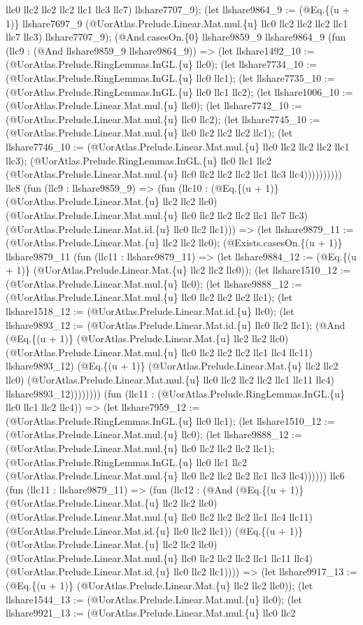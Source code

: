 \documentclass[11pt]{article}
\begin{document}
llc0 llc2 llc2 llc2 llc1 llc3 llc7) llshare7707\_9); (let llshare9864\_9 := (@Eq.\{(u + 1)\} llshare7697\_9 (@UorAtlas.Prelude.Linear.Mat.mul.\{u\} llc0 llc2 llc2 llc2 llc1 llc7 llc3) llshare7707\_9); (@And.casesOn.\{0\} llshare9859\_9 llshare9864\_9 (fun (llc9 : (@And llshare9859\_9 llshare9864\_9)) => (let llshare1492\_10 := (@UorAtlas.Prelude.RingLemmas.InGL.\{u\} llc0); (let llshare7734\_10 := (@UorAtlas.Prelude.RingLemmas.InGL.\{u\} llc0 llc1); (let llshare7735\_10 := (@UorAtlas.Prelude.RingLemmas.InGL.\{u\} llc0 llc1 llc2); (let llshare1006\_10 := (@UorAtlas.Prelude.Linear.Mat.mul.\{u\} llc0); (let llshare7742\_10 := (@UorAtlas.Prelude.Linear.Mat.mul.\{u\} llc0 llc2); (let llshare7745\_10 := (@UorAtlas.Prelude.Linear.Mat.mul.\{u\} llc0 llc2 llc2 llc2 llc1); (let llshare7746\_10 := (@UorAtlas.Prelude.Linear.Mat.mul.\{u\} llc0 llc2 llc2 llc2 llc1 llc3); (@UorAtlas.Prelude.RingLemmas.InGL.\{u\} llc0 llc1 llc2 (@UorAtlas.Prelude.Linear.Mat.mul.\{u\} llc0 llc2 llc2 llc2 llc1 llc3 llc4)))))))))) llc8 (fun (llc9 : llshare9859\_9) => (fun (llc10 : (@Eq.\{(u + 1)\} (@UorAtlas.Prelude.Linear.Mat.\{u\} llc2 llc2 llc0) (@UorAtlas.Prelude.Linear.Mat.mul.\{u\} llc0 llc2 llc2 llc2 llc1 llc7 llc3) (@UorAtlas.Prelude.Linear.Mat.id.\{u\} llc0 llc2 llc1))) => (let llshare9879\_11 := (@UorAtlas.Prelude.Linear.Mat.\{u\} llc2 llc2 llc0); (@Exists.casesOn.\{(u + 1)\} llshare9879\_11 (fun (llc11 : llshare9879\_11) => (let llshare9884\_12 := (@Eq.\{(u + 1)\} (@UorAtlas.Prelude.Linear.Mat.\{u\} llc2 llc2 llc0)); (let llshare1510\_12 := (@UorAtlas.Prelude.Linear.Mat.mul.\{u\} llc0); (let llshare9888\_12 := (@UorAtlas.Prelude.Linear.Mat.mul.\{u\} llc0 llc2 llc2 llc2 llc1); (let llshare1518\_12 := (@UorAtlas.Prelude.Linear.Mat.id.\{u\} llc0); (let llshare9893\_12 := (@UorAtlas.Prelude.Linear.Mat.id.\{u\} llc0 llc2 llc1); (@And (@Eq.\{(u + 1)\} (@UorAtlas.Prelude.Linear.Mat.\{u\} llc2 llc2 llc0) (@UorAtlas.Prelude.Linear.Mat.mul.\{u\} llc0 llc2 llc2 llc2 llc1 llc4 llc11) llshare9893\_12) (@Eq.\{(u + 1)\} (@UorAtlas.Prelude.Linear.Mat.\{u\} llc2 llc2 llc0) (@UorAtlas.Prelude.Linear.Mat.mul.\{u\} llc0 llc2 llc2 llc2 llc1 llc11 llc4) llshare9893\_12)))))))) (fun (llc11 : (@UorAtlas.Prelude.RingLemmas.InGL.\{u\} llc0 llc1 llc2 llc4)) => (let llshare7959\_12 := (@UorAtlas.Prelude.RingLemmas.InGL.\{u\} llc0 llc1); (let llshare1510\_12 := (@UorAtlas.Prelude.Linear.Mat.mul.\{u\} llc0); (let llshare9888\_12 := (@UorAtlas.Prelude.Linear.Mat.mul.\{u\} llc0 llc2 llc2 llc2 llc1); (@UorAtlas.Prelude.RingLemmas.InGL.\{u\} llc0 llc1 llc2 (@UorAtlas.Prelude.Linear.Mat.mul.\{u\} llc0 llc2 llc2 llc2 llc1 llc3 llc4)))))) llc6 (fun (llc11 : llshare9879\_11) => (fun (llc12 : (@And (@Eq.\{(u + 1)\} (@UorAtlas.Prelude.Linear.Mat.\{u\} llc2 llc2 llc0) (@UorAtlas.Prelude.Linear.Mat.mul.\{u\} llc0 llc2 llc2 llc2 llc1 llc4 llc11) (@UorAtlas.Prelude.Linear.Mat.id.\{u\} llc0 llc2 llc1)) (@Eq.\{(u + 1)\} (@UorAtlas.Prelude.Linear.Mat.\{u\} llc2 llc2 llc0) (@UorAtlas.Prelude.Linear.Mat.mul.\{u\} llc0 llc2 llc2 llc2 llc1 llc11 llc4) (@UorAtlas.Prelude.Linear.Mat.id.\{u\} llc0 llc2 llc1)))) => (let llshare9917\_13 := (@Eq.\{(u + 1)\} (@UorAtlas.Prelude.Linear.Mat.\{u\} llc2 llc2 llc0)); (let llshare1544\_13 := (@UorAtlas.Prelude.Linear.Mat.mul.\{u\} llc0); (let llshare9921\_13 := (@UorAtlas.Prelude.Linear.Mat.mul.\{u\} llc0 llc2 
\end{document}
